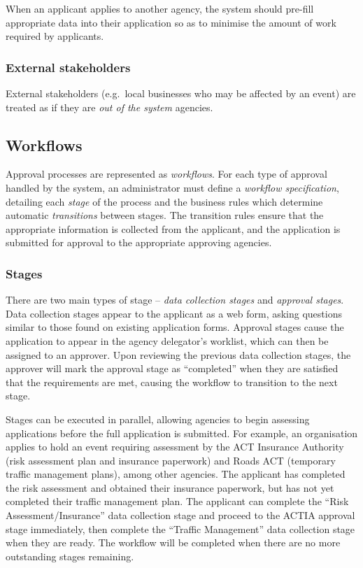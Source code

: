 \documentclass[12pt,a4paper,twosided]{article}
\begin{document}
When an applicant applies to another agency, the system should pre-fill
appropriate data into their application so as to minimise the amount of
work required by applicants.

\subsubsection{External stakeholders}\label{external-stakeholders}

External stakeholders (e.g.~local businesses who may be affected by an
event) are treated as if they are \emph{out of the system} agencies.

\subsection{Workflows}\label{workflows}

Approval processes are represented as \emph{workflows}. For each type of
approval handled by the system, an administrator must define a
\emph{workflow specification}, detailing each \emph{stage} of the
process and the business rules which determine automatic
\emph{transitions} between stages. The transition rules ensure that the
appropriate information is collected from the applicant, and the
application is submitted for approval to the appropriate approving
agencies.

\subsubsection{Stages}\label{stages}

There are two main types of stage -- \emph{data collection stages} and
\emph{approval stages}. Data collection stages appear to the applicant
as a web form, asking questions similar to those found on existing
application forms. Approval stages cause the application to appear in
the agency delegator's worklist, which can then be assigned to an
approver. Upon reviewing the previous data collection stages, the
approver will mark the approval stage as ``completed'' when they are
satisfied that the requirements are met, causing the workflow to
transition to the next stage.

Stages can be executed in parallel, allowing agencies to begin assessing
applications before the full application is submitted. For example, an
organisation applies to hold an event requiring assessment by the ACT
Insurance Authority (risk assessment plan and insurance paperwork) and
Roads ACT (temporary traffic management plans), among other agencies.
The applicant has completed the risk assessment and obtained their
insurance paperwork, but has not yet completed their traffic management
plan. The applicant can complete the ``Risk Assessment/Insurance'' data
collection stage and proceed to the ACTIA approval stage immediately,
then complete the ``Traffic Management'' data collection stage when they
are ready. The workflow will be completed when there are no more
outstanding stages remaining.
\end{document}
